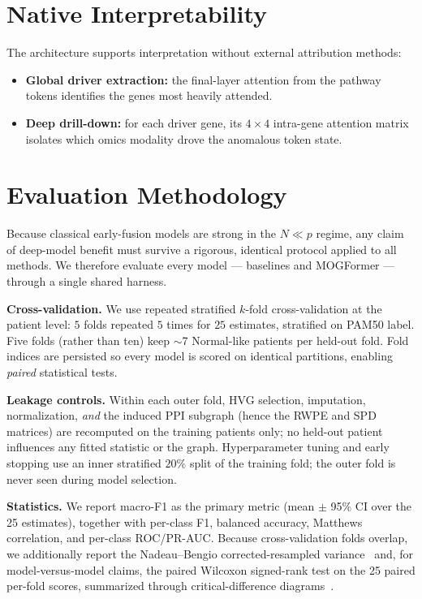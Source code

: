\documentclass[10pt, twocolumn]{article}
\begin{document}
\section{Native Interpretability}
The architecture supports interpretation without external attribution methods:
\begin{itemize}
    \item \textbf{Global driver extraction:} the final-layer attention from the
    pathway tokens identifies the genes most heavily attended.
    \item \textbf{Deep drill-down:} for each driver gene, its $4\times4$
    intra-gene attention matrix isolates which omics modality drove the anomalous
    token state.
\end{itemize}

\section{Evaluation Methodology}
\label{sec:eval}
Because classical early-fusion models are strong in the $N \ll p$ regime, any claim
of deep-model benefit must survive a rigorous, identical protocol applied to all
methods. We therefore evaluate every model --- baselines and MOGFormer --- through
a single shared harness.

\vspace{0.15cm}\noindent\textbf{Cross-validation.}
We use repeated stratified $k$-fold cross-validation at the patient level: $5$
folds repeated $5$ times for $25$ estimates, stratified on PAM50 label. Five folds
(rather than ten) keep $\sim$7 Normal-like patients per held-out fold. Fold
indices are persisted so every model is scored on identical partitions, enabling
\emph{paired} statistical tests.

\vspace{0.15cm}\noindent\textbf{Leakage controls.}
Within each outer fold, HVG selection, imputation, normalization, \emph{and} the
induced PPI subgraph (hence the RWPE and SPD matrices) are recomputed on the
training patients only; no held-out patient influences any fitted statistic or the
graph. Hyperparameter tuning and early stopping use an inner stratified $20\%$
split of the training fold; the outer fold is never seen during model selection.

\vspace{0.15cm}\noindent\textbf{Statistics.}
We report macro-F1 as the primary metric (mean $\pm$ 95\% CI over the 25
estimates), together with per-class F1, balanced accuracy, Matthews correlation,
and per-class ROC/PR-AUC. Because cross-validation folds overlap, we additionally
report the Nadeau--Bengio corrected-resampled variance~\cite{nadeau2003} and, for
model-versus-model claims, the paired Wilcoxon signed-rank test on the 25 paired
per-fold scores, summarized through critical-difference diagrams~\cite{demsar2006}.
\end{document}
